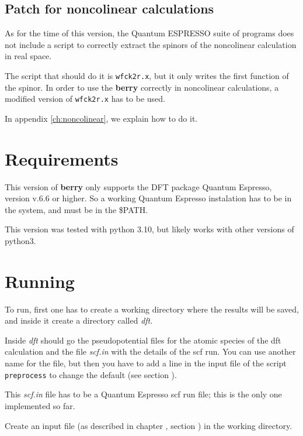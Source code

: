 \documentclass[a4paper,12pt]{report}
\begin{document}
\subsection{Patch for noncolinear calculations}

As for the time of this version, the {\sc Quantum ESPRESSO} suite of programs
does not include a script to correctly extract the spinors of the noncolinear calculation
in real space.

The script that should do it is \verb*|wfck2r.x|, but it only writes the first function of the spinor.
In order to use the \textbf{berry} correctly in noncolinear calculations,
a modified version of \verb*|wfck2r.x| has to be used.

In appendix \ref{ch:noncolinear}, we explain how to do it.



\section{Requirements}

This version of \textbf{berry} only supports the DFT package {\sc Quantum Espresso}, version v.6.6 or higher.
So a working {\sc Quantum Espresso} instalation has to be in the system, and must be in the \$PATH.

This version was tested with python 3.10, but likely works with other versions of python3.


\section{Running}\label{sec:running}

 To run, first one has to create a working directory where the results will be saved,
 and inside it create a directory called \emph{dft}.

 Inside \emph{dft} should go the pseudopotential files for the atomic species of the dft calculation
and the file \emph{scf.in} with the details of the scf run.
You can use another name for the file, but then you have to add a line in the input file of
the script \texttt{preprocess} to change the default (see section ).


 This \emph{scf.in} file has to be a {\sc Quantum Espresso} scf run file;
 this is the only one implemented so far.

 Create an input file (as described in chapter , section )
 in the working directory.
\end{document}
